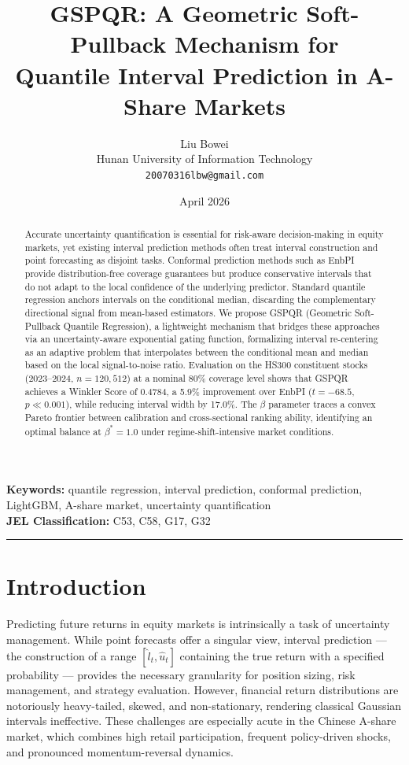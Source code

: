 \documentclass[12pt, a4paper]{article}
\title{GSPQR: A Geometric Soft-Pullback Mechanism for\\
Quantile Interval Prediction in A-Share Markets}
\author{Liu Bowei\\
\small Hunan University of Information Technology\\
\small \texttt{20070316lbw@gmail.com}}
\date{April 2026}
\begin{document}
\maketitle

\begin{abstract}
Accurate uncertainty quantification is essential for risk-aware decision-making in
equity markets, yet existing interval prediction methods often treat interval
construction and point forecasting as disjoint tasks. Conformal prediction methods
such as EnbPI provide distribution-free coverage guarantees but produce conservative
intervals that do not adapt to the local confidence of the underlying predictor.
Standard quantile regression anchors intervals on the conditional median, discarding
the complementary directional signal from mean-based estimators. We propose GSPQR
(Geometric Soft-Pullback Quantile Regression), a lightweight mechanism that bridges
these approaches via an uncertainty-aware exponential gating function, formalizing
interval re-centering as an adaptive problem that interpolates between the conditional
mean and median based on the local signal-to-noise ratio. Evaluation on the HS300
constituent stocks (2023--2024, $n = 120{,}512$) at a nominal 80\% coverage level
shows that GSPQR achieves a Winkler Score of 0.4784, a 5.9\% improvement over EnbPI
($t = -68.5$, $p \ll 0.001$), while reducing interval width by 17.0\%. The $\beta$
parameter traces a convex Pareto frontier between calibration and cross-sectional
ranking ability, identifying an optimal balance at $\beta^* = 1.0$ under
regime-shift-intensive market conditions.
\end{abstract}

\textbf{Keywords:} quantile regression, interval prediction, conformal prediction,
LightGBM, A-share market, uncertainty quantification\\

\textbf{JEL Classification:} C53, C58, G17, G32

\hrule
\vspace{1em}

\section{Introduction}

Predicting future returns in equity markets is intrinsically a task of uncertainty
management. While point forecasts offer a singular view, interval prediction --- the
construction of a range $[\hat{l}_t, \hat{u}_t]$ containing the true return with a
specified probability --- provides the necessary granularity for position sizing, risk
management, and strategy evaluation. However, financial return distributions are
notoriously heavy-tailed, skewed, and non-stationary, rendering classical Gaussian
intervals ineffective. These challenges are especially acute in the Chinese A-share
market, which combines high retail participation, frequent policy-driven shocks, and
pronounced momentum-reversal dynamics.
\end{document}
